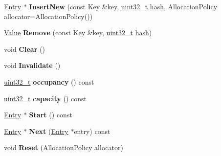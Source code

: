 \begin{DoxyCompactItemize}
\item 
\mbox{\label{classv8_1_1base_1_1TemplateHashMapImpl_a2dbaf51abc0af7c1e63d603df7ad25a9}} 
\mbox{\hyperlink{structv8_1_1base_1_1TemplateHashMapEntry}{Entry}} $\ast$ {\bfseries Insert\+New} (const Key \&key, \mbox{\hyperlink{classuint32__t}{uint32\+\_\+t}} \mbox{\hyperlink{structv8_1_1base_1_1hash}{hash}}, Allocation\+Policy allocator=Allocation\+Policy())
\item 
\mbox{\label{classv8_1_1base_1_1TemplateHashMapImpl_aa599c82bb4622c59e81cd5cf48e5617c}} 
\mbox{\hyperlink{classv8_1_1Value}{Value}} {\bfseries Remove} (const Key \&key, \mbox{\hyperlink{classuint32__t}{uint32\+\_\+t}} \mbox{\hyperlink{structv8_1_1base_1_1hash}{hash}})
\item 
\mbox{\label{classv8_1_1base_1_1TemplateHashMapImpl_ad3298b5c512442c1838ab3e3fc49276c}} 
void {\bfseries Clear} ()
\item 
\mbox{\label{classv8_1_1base_1_1TemplateHashMapImpl_a3abc22f8779c331a3300c6835a0a4707}} 
void {\bfseries Invalidate} ()
\item 
\mbox{\label{classv8_1_1base_1_1TemplateHashMapImpl_a719951e26d7f992e9171b218bf224933}} 
\mbox{\hyperlink{classuint32__t}{uint32\+\_\+t}} {\bfseries occupancy} () const
\item 
\mbox{\label{classv8_1_1base_1_1TemplateHashMapImpl_aa87d244a2658318fb7e5be58d7d8284f}} 
\mbox{\hyperlink{classuint32__t}{uint32\+\_\+t}} {\bfseries capacity} () const
\item 
\mbox{\label{classv8_1_1base_1_1TemplateHashMapImpl_a5206215bb871c383f69388c5c45785f7}} 
\mbox{\hyperlink{structv8_1_1base_1_1TemplateHashMapEntry}{Entry}} $\ast$ {\bfseries Start} () const
\item 
\mbox{\label{classv8_1_1base_1_1TemplateHashMapImpl_a1ec40e5888a1f03df09e7cf63e3cd790}} 
\mbox{\hyperlink{structv8_1_1base_1_1TemplateHashMapEntry}{Entry}} $\ast$ {\bfseries Next} (\mbox{\hyperlink{structv8_1_1base_1_1TemplateHashMapEntry}{Entry}} $\ast$entry) const
\item 
\mbox{\label{classv8_1_1base_1_1TemplateHashMapImpl_a63f2837401c1c41a7db5b4078297e290}} 
void {\bfseries Reset} (Allocation\+Policy allocator)
\end{DoxyCompactItemize}
